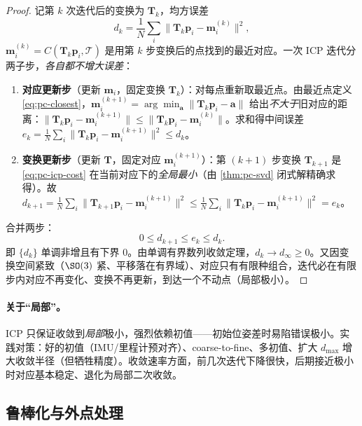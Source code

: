 \begin{proof}
记第 $k$ 次迭代后的变换为 $\mathbf{T}_k$，均方误差
\begin{equation}
  d_k=\frac{1}{N}\sum_i\big\|\mathbf{T}_k\mathbf{p}_i-\mathbf{m}_i^{(k)}\big\|^2,
  \label{eq:pc-dk}
\end{equation}
$\mathbf{m}_i^{(k)}=C(\mathbf{T}_k\mathbf{p}_i,\mathcal{T})$ 是用第 $k$ 步变换后的点找到的最近对应。一次 ICP 迭代分两子步，\emph{各自都不增大误差}：
\begin{enumerate}
  \item \textbf{对应更新步}（更新 $\mathbf{m}_i$，固定变换 $\mathbf{T}_k$）：对每点重新取最近点。由最近点定义 \cref{eq:pc-closest}，$\mathbf{m}_i^{(k+1)}=\arg\min_{\mathbf{a}}\|\mathbf{T}_k\mathbf{p}_i-\mathbf{a}\|$ 给出\emph{不大于}旧对应的距离：$\|\mathbf{T}_k\mathbf{p}_i-\mathbf{m}_i^{(k+1)}\|\le\|\mathbf{T}_k\mathbf{p}_i-\mathbf{m}_i^{(k)}\|$。求和得中间误差 $e_k=\frac{1}{N}\sum_i\|\mathbf{T}_k\mathbf{p}_i-\mathbf{m}_i^{(k+1)}\|^2\le d_k$。
  \item \textbf{变换更新步}（更新 $\mathbf{T}$，固定对应 $\mathbf{m}_i^{(k+1)}$）：第 $(k{+}1)$ 步变换 $\mathbf{T}_{k+1}$ 是 \cref{eq:pc-icp-cost} 在当前对应下的\emph{全局最小}（由 \cref{thm:pc-svd} 闭式解精确求得）。故 $d_{k+1}=\frac{1}{N}\sum_i\|\mathbf{T}_{k+1}\mathbf{p}_i-\mathbf{m}_i^{(k+1)}\|^2\le\frac{1}{N}\sum_i\|\mathbf{T}_k\mathbf{p}_i-\mathbf{m}_i^{(k+1)}\|^2=e_k$。
\end{enumerate}
合并两步：
\begin{equation}
  0\le d_{k+1}\le e_k\le d_k.
  \label{eq:pc-monotone}
\end{equation}
即 $\{d_k\}$ 单调非增且有下界 $0$。由单调有界数列收敛定理，$d_k\to d_\infty\ge0$。又因变换空间紧致（$\SO(3)$ 紧、平移落在有界域）、对应只有有限种组合，迭代必在有限步内对应不再变化、变换不再更新，到达一个不动点（局部极小）。
\end{proof}

\paragraph{关于“局部”。}
ICP 只保证收敛到\emph{局部}极小，强烈依赖初值——初始位姿差时易陷错误极小。实践对策：好的初值（IMU/里程计预对齐）、coarse-to-fine、多初值、扩大 $d_{\max}$ 增大收敛半径（但牺牲精度）。收敛速率方面，前几次迭代下降很快，后期接近极小时对应基本稳定、退化为局部二次收敛。

\subsection{鲁棒化与外点处理}
\label{sec:pc-icp-robust}

